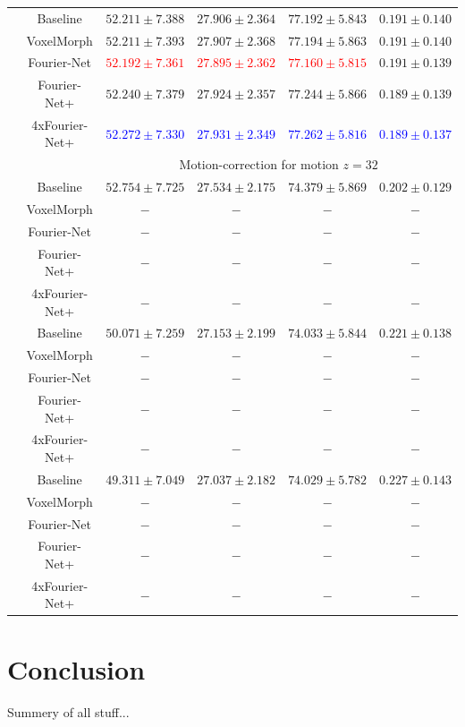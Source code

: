 \documentclass[english,version-2022-01]{uzl-thesis} %
\begin{document}
\begin{table}[h]
\begin{tabular}{c c c c c c}
		\midrule		
		\multirow{5}{*}{\rotatebox{90}{$R=10$}} & Baseline & $52.211 \pm 7.388$ & $27.906 \pm 2.364$ & $77.192 \pm 5.843$ & $0.191 \pm 0.140$ \\  
		 & VoxelMorph & $52.211 \pm 7.393$ & $27.907 \pm 2.368$ & $77.194 \pm 5.863$ & $0.191 \pm 0.140$ \\  
		 & Fourier-Net & \textcolor{red}{$52.192 \pm 7.361$} & \textcolor{red}{$27.895 \pm 2.362$} & \textcolor{red}{$77.160 \pm 5.815$} & $0.191 \pm 0.139$ \\  
		 & Fourier-Net+ & $52.240 \pm 7.379$ & $27.924 \pm 2.357$ & $77.244 \pm 5.866$ & $0.189 \pm 0.139$ \\   
		 & 4xFourier-Net+ & \textcolor{blue}{$52.272 \pm 7.330$} & \textcolor{blue}{$27.931 \pm 2.349$} & \textcolor{blue}{$77.262 \pm 5.816$} & \textcolor{blue}{$0.189 \pm 0.137$} \\ 
		 
		 \midrule	
		 & & \multicolumn{4}{c}{Motion-correction for motion $z=32$} \\
		\midrule
		\multirow{5}{*}{\rotatebox{90}{$R=4$}} & Baseline & $52.754 \pm 7.725$ & $27.534 \pm 2.175$ & $74.379 \pm 5.869$ & $0.202 \pm 0.129$ \\  
		 & VoxelMorph & $-$ & $-$ & $-$ & $-$ \\  
		 & Fourier-Net & $-$ & $-$ & $-$ & $-$ \\  
		 & Fourier-Net+ & $-$ & $-$ & $-$ & $-$ \\   
		 & 4xFourier-Net+ & $-$ & $-$ & $-$ & $-$ \\  
		
		\midrule
		\multirow{5}{*}{\rotatebox{90}{$R=8$}} & Baseline & $50.071 \pm 7.259$ & $27.153 \pm 2.199$ & $74.033 \pm 5.844$ & $0.221 \pm 0.138$ \\  
		 & VoxelMorph & $-$ & $-$ & $-$ & $-$ \\  
		 & Fourier-Net & $-$ & $-$ & $-$ & $-$ \\  
		 & Fourier-Net+ & $-$ & $-$ & $-$ & $-$ \\   
		 & 4xFourier-Net+ & $-$ & $-$ & $-$ & $-$ \\ 
		 	 
		\midrule		
		\multirow{5}{*}{\rotatebox{90}{$R=10$}} & Baseline & $49.311 \pm 7.049$ & $27.037 \pm 2.182$ & $74.029 \pm 5.782$ & $0.227 \pm 0.143$ \\  
		 & VoxelMorph & $-$ & $-$ & $-$ & $-$ \\  
		 & Fourier-Net & $-$ & $-$ & $-$ & $-$ \\  
		 & Fourier-Net+ & $-$ & $-$ & $-$ & $-$ \\   
		 & 4xFourier-Net+ & $-$ & $-$ & $-$ & $-$ \\ 
		 \bottomrule
	\end{tabular}
\end{table}


\chapter{Conclusion} \label{Ch:Conclusion}
Summery of all stuff...
\end{document}

